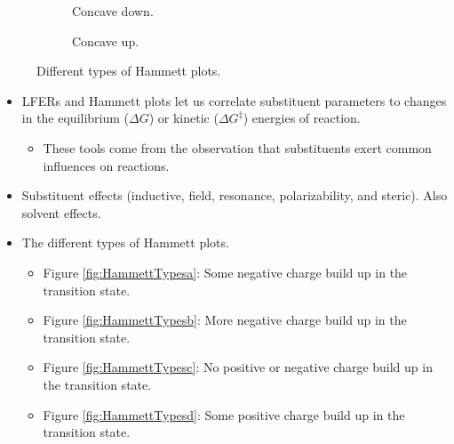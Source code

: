 \documentclass[../notes.tex]{subfiles}
\begin{document}
\begin{itemize}
\begin{figure}[h!]
        \begin{subfigure}[b]{0.16\linewidth}
            \centering
            \caption{Concave down.}
            \label{fig:HammettTypese}
        \end{subfigure}
        \begin{subfigure}[b]{0.16\linewidth}
            \centering
            \caption{Concave up.}
            \label{fig:HammettTypesf}
        \end{subfigure}
        \caption{Different types of Hammett plots.}
        \label{fig:HammettTypes}
    \end{figure}
    \begin{itemize}
        \item LFERs and Hammett plots let us correlate substituent parameters to changes in the equilibrium ($\Delta G$) or kinetic ($\Delta G^\ddagger$) energies of reaction.
        \begin{itemize}
            \item These tools come from the observation that substituents exert common influences on reactions.
        \end{itemize}
        \item Substituent effects (inductive, field, resonance, polarizability, and steric). Also solvent effects.
        \item The different types of Hammett plots.
        \begin{itemize}
            \item Figure \ref{fig:HammettTypesa}: Some negative charge build up in the transition state.
            \item Figure \ref{fig:HammettTypesb}: More negative charge build up in the transition state.
            \item Figure \ref{fig:HammettTypesc}: No positive or negative charge build up in the transition state.
            \item Figure \ref{fig:HammettTypesd}: Some positive charge build up in the transition state.

\end{itemize}
\end{itemize}
\end{itemize}
\end{document}
